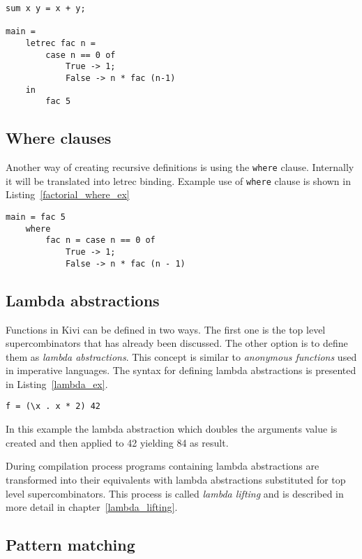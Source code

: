 \documentclass[a4paper]{report}
\begin{document}
\begin{lstlisting}[label=factorial_letrec_ex,caption={Factorial function using \texttt{letrec}.}]
sum x y = x + y;

main =
    letrec fac n =
        case n == 0 of
            True -> 1;
            False -> n * fac (n-1)
    in
        fac 5
\end{lstlisting}

\subsection{Where clauses}
Another way of creating recursive definitions is using the \texttt{where}
clause. Internally it will be translated into letrec binding. Example use of
\texttt{where} clause is shown in Listing~\ref{factorial_where_ex}

\begin{lstlisting}[label=factorial_where_ex,caption={Factorial function using \texttt{where}.}]
main = fac 5
    where
        fac n = case n == 0 of
            True -> 1;
            False -> n * fac (n - 1)
\end{lstlisting}

\subsection{Lambda abstractions}
Functions in Kivi can be defined in two ways. The first one is the top level
supercombinators that has already been discussed. The other option is to define
them as \textit{lambda abstractions}. This concept is similar to \textit{anonymous
functions} used in imperative languages. The syntax for defining lambda
abstractions is presented in Listing~\ref{lambda_ex}.

\begin{lstlisting}[label=lambda_ex,caption={Lambda abstraction}]
f = (\x . x * 2) 42
\end{lstlisting}

In this example the lambda abstraction which doubles the arguments value is
created and then applied to 42 yielding 84 as result.

During compilation process programs containing lambda abstractions are
transformed into their equivalents with lambda abstractions substituted for top
level supercombinators. This process is called \textit{lambda lifting} and is
described in more detail in chapter~\ref{lambda_lifting}.

\subsection{Pattern matching}
\end{document}
